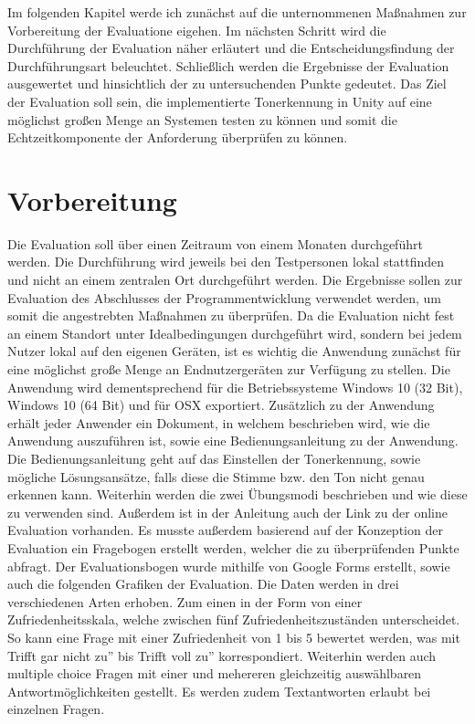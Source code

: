 Im folgenden Kapitel werde ich zunächst auf die unternommenen Maßnahmen zur Vorbereitung der Evaluatione eigehen. Im nächsten Schritt wird die Durchführung der Evaluation näher erläutert und die Entscheidungsfindung der Durchführungsart beleuchtet. Schließlich werden die Ergebnisse der Evaluation ausgewertet und hinsichtlich der zu untersuchenden Punkte gedeutet.  Das Ziel der Evaluation soll sein, die implementierte Tonerkennung in Unity auf eine möglichst großen Menge an Systemen testen zu können und somit die Echtzeitkomponente der Anforderung überprüfen zu können. 
\section{Vorbereitung}
Die Evaluation soll über einen Zeitraum von einem Monaten durchgeführt werden. Die Durchführung wird jeweils bei den Testpersonen lokal stattfinden und nicht an einem zentralen Ort durchgeführt werden. Die Ergebnisse sollen zur Evaluation des Abschlusses der Programmentwicklung verwendet werden, um somit die angestrebten Maßnahmen zu überprüfen. 
Da die Evaluation nicht fest an einem Standort unter Idealbedingungen durchgeführt wird, sondern bei jedem Nutzer lokal auf den eigenen Geräten, ist es wichtig die Anwendung zunächst für eine möglichst große Menge an Endnutzergeräten zur Verfügung zu stellen. Die Anwendung wird dementsprechend für die Betriebssysteme Windows 10 (32 Bit), Windows 10 (64 Bit) und für OSX exportiert. Zusätzlich zu der Anwendung erhält jeder Anwender ein Dokument, in welchem beschrieben wird, wie die Anwendung auszuführen ist, sowie eine Bedienungsanleitung zu der Anwendung. Die Bedienungsanleitung geht auf das Einstellen der Tonerkennung, sowie mögliche Lösungsansätze, falls diese die Stimme bzw. den Ton nicht genau erkennen kann. Weiterhin werden die zwei Übungsmodi beschrieben und wie diese zu verwenden sind. Außerdem ist in der Anleitung auch der Link zu der online Evaluation vorhanden. Es musste außerdem basierend auf der Konzeption der Evaluation ein Fragebogen erstellt werden, welcher die zu überprüfenden Punkte abfragt. Der Evaluationsbogen wurde mithilfe von Google Forms erstellt, sowie auch die folgenden Grafiken der Evaluation. Die Daten werden in drei verschiedenen Arten erhoben. Zum einen in der Form von einer Zufriedenheitsskala, welche zwischen fünf Zufriedenheitszuständen unterscheidet. So kann eine Frage mit einer Zufriedenheit von 1 bis 5 bewertet werden, was mit \glqq Trifft gar nicht zu'' bis \glqq Trifft voll zu'' korrespondiert. Weiterhin werden auch multiple choice Fragen mit einer und mehereren gleichzeitig auswählbaren Antwortmöglichkeiten gestellt. Es werden zudem Textantworten erlaubt bei einzelnen Fragen. 

